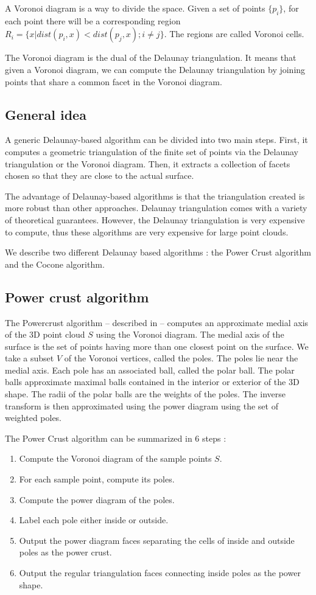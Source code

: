\documentclass[12pt]{article}
\begin{document}
A Voronoi diagram is a way to divide the space. Given a set of points $\{p_i\}$,  for each point there will be a corresponding region $R_i = \{x | dist(p_i,x) < dist(p_j,x) ; i \ne j\}$. The regions are called Voronoi cells. 

The Voronoi diagram is the dual of the Delaunay triangulation. It means that given a Voronoi diagram, we can compute the Delaunay triangulation by joining points that share a common facet in the Voronoi diagram.

\subsection{General idea}
A generic Delaunay-based algorithm can be divided into two main steps. First, it computes a geometric triangulation of the finite set of points via the Delaunay triangulation or the Voronoi diagram. Then, it extracts a collection of facets chosen so that they are close to the actual surface.

The advantage of Delaunay-based algorithms is that the triangulation created is more robust than other approaches. Delaunay triangulation comes with a variety of theoretical guarantees. However, the Delaunay triangulation is very expensive to compute, thus these algorithms are very expensive for large point clouds.

We describe two different Delaunay based algorithms : the Power Crust algorithm and the Cocone algorithm.

\subsection{Power crust algorithm}
\label{subsec:pca}
The Powercrust algorithm -- described in \cite{Powercrust}-- computes an approximate medial axis of the 3D point cloud $S$ using the Voronoi diagram. The medial axis of the surface is the set of points having more than one closest point on the surface. We take a subset $V$ of the Voronoi vertices, called the poles. The poles lie near the medial axis. Each pole has an associated ball, called the polar ball. The polar balls approximate maximal balls contained in the interior or exterior of the 3D shape. The radii of the polar balls are the weights of the poles. The inverse transform is then approximated using the power diagram using the set of weighted poles.

The Power Crust algorithm can be summarized in 6 steps :
\begin{enumerate}
\item Compute the Voronoi diagram of the sample points $S$.
\item For each sample point, compute its poles.
\item Compute the power diagram of the poles.
\item Label each pole either inside or outside.
\item Output the power diagram faces separating the cells of inside and outside poles as the power crust.
\item Output the regular triangulation faces connecting inside poles as the power shape.
\end{enumerate}
\end{document}
